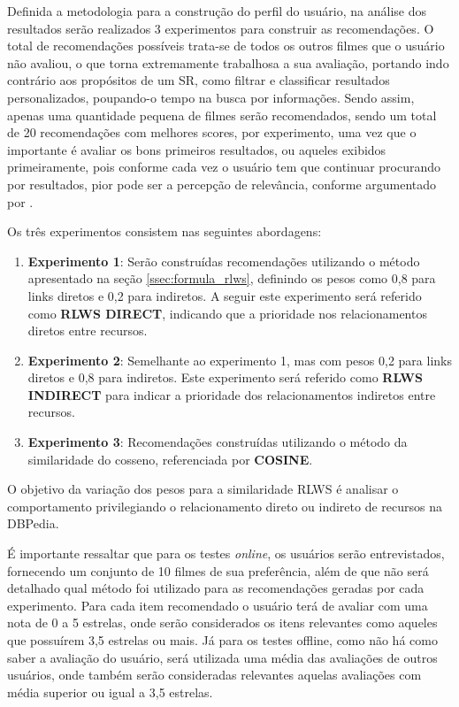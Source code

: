 Definida a metodologia para a construção do perfil do usuário, na análise dos resultados serão realizados 3 experimentos para construir as recomendações. O total de recomendações possíveis trata-se de todos os outros filmes que o usuário não avaliou, o que torna extremamente trabalhosa a sua avaliação, portando indo contrário aos propósitos de um \ac{SR}, como filtrar e classificar resultados personalizados, poupando-o tempo na busca por informações. Sendo assim, apenas uma quantidade pequena de filmes serão recomendados, sendo um total de 20 recomendações com melhores scores, por experimento, uma vez que o importante é avaliar os bons primeiros resultados, ou aqueles exibidos primeiramente, pois conforme cada vez o usuário tem que continuar procurando por resultados, pior pode ser a percepção de relevância, conforme argumentado por \cite{Manning:2008}. 

Os três experimentos consistem nas seguintes abordagens:

\begin{enumerate}
	\item{\textbf{Experimento 1}: Serão construídas recomendações utilizando o método apresentado na seção \ref{ssec:formula_rlws}, definindo os pesos como 0,8 para links diretos e 0,2 para indiretos. A seguir este experimento será referido como \textbf{RLWS DIRECT}, indicando que a prioridade nos relacionamentos diretos entre recursos.}
	\item{\textbf{Experimento 2}: Semelhante ao experimento 1, mas com pesos 0,2 para links diretos e 0,8 para indiretos. Este experimento será referido como \textbf{RLWS INDIRECT} para indicar a prioridade dos relacionamentos indiretos entre recursos.}
	\item{\textbf{Experimento 3}: Recomendações construídas utilizando o método da similaridade do cosseno, referenciada por \textbf{COSINE}.}
\end{enumerate}

O objetivo da variação dos pesos para a similaridade \ac{RLWS} é analisar o comportamento privilegiando o relacionamento direto ou indireto de recursos na DBPedia.
 
É importante ressaltar que para os testes \textit{online}, os usuários serão entrevistados, fornecendo um conjunto de 10 filmes de sua preferência, além de que não será detalhado qual método foi utilizado para as recomendações geradas por cada experimento. Para cada item recomendado o usuário terá de avaliar com uma nota de 0 a 5 estrelas, onde serão considerados os itens relevantes como aqueles que possuírem 3,5 estrelas ou mais. Já para os testes offline, como não há como saber a avaliação do usuário, será utilizada uma média das avaliações de outros usuários, onde também serão consideradas relevantes aquelas avaliações com média superior ou igual a 3,5 estrelas.

